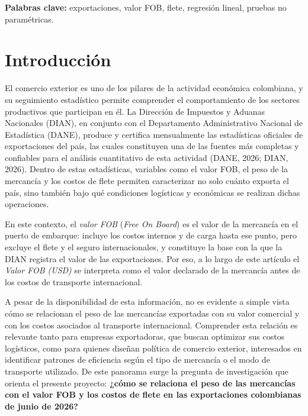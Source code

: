 \documentclass[12pt]{article}
\begin{document}
\vspace{0.6cm}
\noindent\textbf{Palabras clave:} exportaciones, valor FOB, flete,
regresión lineal, pruebas no paramétricas.

\newpage

\section{Introducción}

El comercio exterior es uno de los pilares de la actividad económica
colombiana, y su seguimiento estadístico permite comprender el
comportamiento de los sectores productivos que participan en él. La
Dirección de Impuestos y Aduanas Nacionales (DIAN), en conjunto con el
Departamento Administrativo Nacional de Estadística (DANE), produce y
certifica mensualmente las estadísticas oficiales de exportaciones del
país, las cuales constituyen una de las fuentes más completas y
confiables para el análisis cuantitativo de esta actividad (DANE, 2026;
DIAN, 2026). Dentro de estas estadísticas, variables como el valor
FOB, el peso de la mercancía y los costos de flete permiten caracterizar
no solo cuánto exporta el país, sino también bajo qué condiciones
logísticas y económicas se realizan dichas operaciones.

En este contexto, el \emph{valor FOB} (\emph{Free On Board}) es el valor
de la mercancía en el puerto de embarque: incluye los costos internos y
de carga hasta ese punto, pero excluye el flete y el seguro
internacionales, y constituye la base con la que la DIAN registra el
valor de las exportaciones. Por eso, a lo largo de este artículo el
\emph{Valor FOB (USD)} se interpreta como el valor declarado de la
mercancía antes de los costos de transporte internacional.

A pesar de la disponibilidad de esta información, no es evidente a
simple vista cómo se relacionan el peso de las mercancías exportadas
con su valor comercial y con los costos asociados al transporte
internacional. Comprender esta relación es relevante tanto para
empresas exportadoras, que buscan optimizar sus costos logísticos,
como para quienes diseñan política de comercio exterior, interesados
en identificar patrones de eficiencia según el tipo de mercancía o el
modo de transporte utilizado. De este panorama surge la pregunta de
investigación que orienta el presente proyecto: \textbf{¿cómo se
relaciona el peso de las mercancías con el valor FOB y los costos de
flete en las exportaciones colombianas de junio de 2026?}
\end{document}

